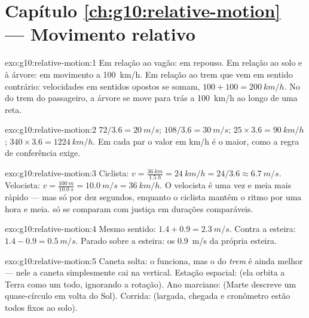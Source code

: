 \section*{Capítulo \ref{ch:g10:relative-motion} --- Movimento relativo}

\begin{solution}{exo:g10:relative-motion:1}
Em relação ao vagão: em repouso. Em relação ao solo e à árvore: em
movimento a \qty{100}{km/h}. Em relação ao trem que vem em sentido
contrário: velocidades em sentidos opostos se somam,
$100 + 100 = \qty{200}{km/h}$. No  do trem do passageiro, a
árvore se move para trás a \qty{100}{km/h} ao longo de uma reta.
\end{solution}

\begin{solution}{exo:g10:relative-motion:2}
$72 / 3.6 = \qty{20}{m/s}$; $108 / 3.6 = \qty{30}{m/s}$;
$25 \times 3.6 = \qty{90}{km/h}$; $340 \times 3.6 = \qty{1224}{km/h}$. Em
cada par o valor em \unit{km/h} é o maior, como a regra de conferência
exige.
\end{solution}

\begin{solution}{exo:g10:relative-motion:3}
Ciclista: $v = \frac{\qty{36}{km}}{\qty{1.5}{h}} = \qty{24}{km/h}
= 24/3.6 \approx \qty{6.7}{m/s}$. Velocista:
$v = \frac{\qty{100}{m}}{\qty{10.0}{s}} = \qty{10.0}{m/s}
= \qty{36}{km/h}$. O velocista é uma vez e meia mais rápido --- mas só
por dez segundos, enquanto o ciclista mantém o ritmo por uma hora e meia.
 só se comparam com justiça em durações comparáveis.
\end{solution}

\begin{solution}{exo:g10:relative-motion:4}
Mesmo sentido: $1.4 + 0.9 = \qty{2.3}{m/s}$. Contra a esteira:
$1.4 - 0.9 = \qty{0.5}{m/s}$. Parado sobre a esteira: os \qty{0.9}{m/s}
da própria esteira.
\end{solution}

\begin{solution}{exo:g10:relative-motion:5}
Caneta solta: o  funciona, mas o  do
\emph{trem} é ainda melhor --- nele a caneta simplesmente cai na
vertical. Estação espacial:  (ela orbita a Terra
como um todo, ignorando a rotação). Ano marciano:  (Marte descreve um quase-círculo em volta do Sol). Corrida:
 (largada, chegada e cronômetro estão todos fixos ao
solo).
\end{solution}

